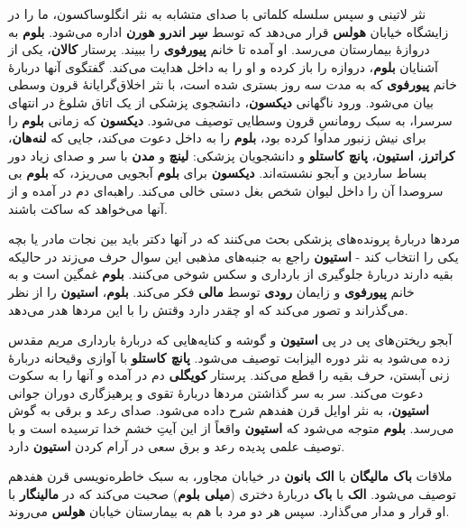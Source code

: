 \documentclass[12pt]{book}
\newcommand{\noun}[1]{{\textbf{#1}}}
\begin{document}
    نثر لاتینی و سپس سلسله کلماتی با صدای متشابه به نثر انگلوساکسون، ما را در زایشگاه خیابان \noun{هولس} قرار می‌دهد که توسط \noun{سِر اندرو هورن} اداره می‌شود. \noun{بلوم} به دروازهٔ بیمارستان می‌رسد. او آمده تا خانم \noun{پیورفوی} را ببیند. پرستار \noun{کالان}، یکی از آشنایان \noun{بلوم}، دروازه را باز کرده و او را به داخل هدایت می‌کند. گفتگوی آنها دربارهٔ خانم \noun{پیورفوی} که به مدت سه روز بستری شده است، با نثر اخلاق‌گرایانهٔ قرون وسطی بیان می‌شود. ورود ناگهانی \noun{دیکسون}، دانشجوی پزشکی از یک اتاق شلوغ در انتهای سرسرا، به سبک رومانسِ قرون وسطایی توصیف می‌شود. \noun{دیکسون} که زمانی \noun{بلوم} را برای نیش زنبور مداوا کرده بود، \noun{بلوم} را به داخل دعوت می‌کند، جایی که \noun{لنه‌هان}، \noun{کراترز}، \noun{استیون}، \noun{پانچ کاستلو} و دانشجویان پزشکی: \noun{لینچ} و \noun{مدن} با سر و صدای زیاد دور بساط ساردین و آبجو نشسته‌اند. \noun{دیکسون} برای \noun{بلوم} آبجویی می‌ریزد، که \noun{بلوم} بی سروصدا آن را داخل لیوان شخص بغل دستی خالی می‌کند. راهبه‌ای دم در آمده و از آنها می‌خواهد که ساکت باشند.

    مردها دربارهٔ پرونده‌های پزشکی بحث می‌کنند که در آنها دکتر باید بین نجات مادر یا بچه یکی را انتخاب کند - \noun{استیون} راجع به جنبه‌های مذهبی این سوال حرف می‌زند در حالیکه بقیه دارند دربارهٔ جلوگیری از بارداری و سکس شوخی می‌کنند. \noun{بلوم} غمگین است و به خانم \noun{پیورفوی} و زایمان \noun{رودی} توسط \noun{مالی} فکر می‌کند. \noun{بلوم}، \noun{استیون} را از نظر می‌گذراند و تصور می‌کند که او چقدر دارد وقتش را با این مردها هدر می‌دهد.

    آبجو ریختن‌های پی در پی \noun{استیون} و گوشه و کنایه‌هایی که دربارهٔ بارداری مریم مقدس زده می‌شود به نثر دوره الیزابت توصیف می‌شود. \noun{پانچ کاستلو} با آوازی وقیحانه دربارهٔ زنی آبستن، حرف بقیه را قطع می‌کند. پرستار \noun{کویگلی} دم در آمده و آنها را به سکوت دعوت می‌کند. سر به سر گذاشتن مردها دربارهٔ تقوی و پرهیزگاری دوران جوانی \noun{استیون}، به نثر اوایل قرن هفدهم شرح داده می‌شود. صدای رعد و برقی به گوش می‌رسد. \noun{بلوم} متوجه می‌شود که \noun{استیون} واقعاً از این آیتِ خشم خدا ترسیده است و با توصیف علمی پدیده رعد و برق سعی در آرام کردن \noun{استیون} دارد.

    ملاقات \noun{باک مالیگان‬} با \noun{الک بانون} در خیابان مجاور، به سبک خاطره‌نویسی قرن هفدهم توصیف می‌شود. \noun{الک} با \noun{باک}  دربارهٔ دختری (\noun{میلی بلوم}) صحبت می‌کند که در \noun{مالینگار} با او قرار و مدار می‌گذارد. سپس هر دو مرد با هم به بیمارستان خیابان \noun{هولس} می‌روند.
\end{document}

